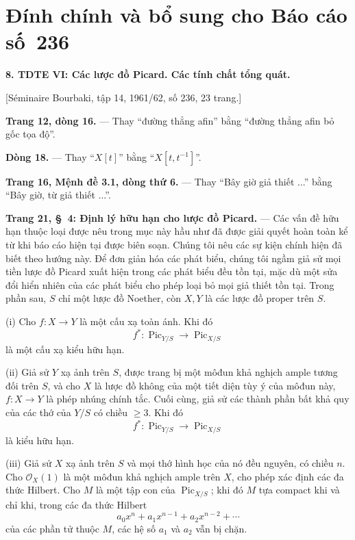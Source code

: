 \clearpage
\chapter*{Đính chính và bổ sung cho Báo cáo số~236}

\noindent\textbf{8. TDTE VI: Các lược đồ Picard. Các tính chất tổng quát.}

\begin{center}
[Séminaire Bourbaki, tập 14, 1961/62, số 236, 23 trang.]
\end{center}

\noindent\textbf{Trang 12, dòng 16.} --- Thay ``đường thẳng afin'' bằng
``đường thẳng afin bỏ gốc tọa độ''.

\noindent\textbf{Dòng 18.} --- Thay ``$X[t]$'' bằng
``$X[t,t^{-1}]$''.

\noindent\textbf{Trang 16, Mệnh đề 3.1, dòng thứ 6.} --- Thay ``Bây giờ giả
thiết ...'' bằng ``Bây giờ, từ giả thiết ...''.

\noindent\textbf{Trang 21, §~4: Định lý hữu hạn cho lược đồ Picard.} --- Các
vấn đề hữu hạn thuộc loại được nêu trong mục này hầu như đã được giải quyết
hoàn toàn kể từ khi báo cáo hiện tại được biên soạn. Chúng tôi nêu các sự kiện
chính hiện đã biết theo hướng này. Để đơn giản hóa các phát biểu, chúng tôi
ngầm giả sử mọi tiền lược đồ Picard xuất hiện trong các phát biểu đều tồn tại,
mặc dù một sửa đổi hiển nhiên của các phát biểu cho phép loại bỏ mọi giả
thiết tồn tại. Trong phần sau, $S$ chỉ một lược đồ Noether, còn $X,Y$ là các
lược đồ proper trên $S$.

\medskip
\noindent(i) Cho $f:X\longrightarrow Y$ là một cấu xạ toàn ánh. Khi đó
\[
f^*: \operatorname{Pic}_{Y/S}\longrightarrow\operatorname{Pic}_{X/S}
\]
là một cấu xạ kiểu hữu hạn.

\noindent(ii) Giả sử $Y$ xạ ảnh trên $S$, được trang bị một môđun khả nghịch
ample tương đối trên $S$, và cho $X$ là lược đồ không của một tiết diện tùy ý
của môđun này, $f:X\longrightarrow Y$ là phép nhúng chính tắc. Cuối cùng, giả
sử các thành phần bất khả quy của các thớ của $Y/S$ có chiều $\geq3$. Khi đó
\[
f^*: \operatorname{Pic}_{Y/S}\longrightarrow\operatorname{Pic}_{X/S}
\]
là kiểu hữu hạn.

\noindent(iii) Giả sử $X$ xạ ảnh trên $S$ và mọi thớ hình học của nó đều
nguyên, có chiều $n$. Cho $\mathcal O_X(1)$ là một môđun khả nghịch ample trên
$X$, cho phép xác định các đa thức Hilbert. Cho $M$ là một tập con của
$\operatorname{Pic}_{X/S}$; khi đó $M$ tựa compact khi và chỉ khi, trong các
đa thức Hilbert
\[
a_0x^n+a_1x^{n-1}+a_2x^{n-2}+\cdots
\]
của các phần tử thuộc $M$, các hệ số $a_1$ và $a_2$ vẫn bị chặn.

